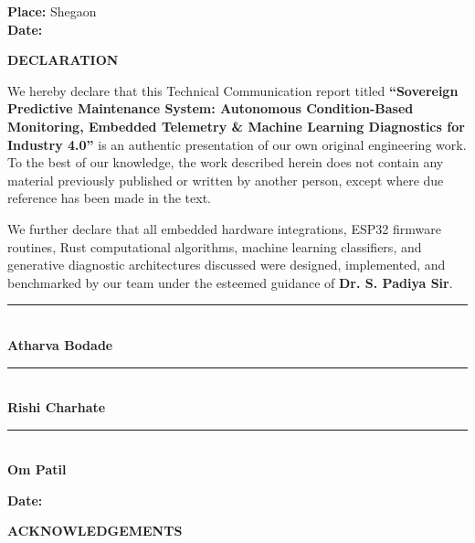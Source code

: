 \documentclass[12pt,a4paper,oneside]{report}
\begin{document}
\vspace{20mm}
\noindent \textbf{Place:} Shegaon \\
\textbf{Date:} \dotfill

\newpage
\thispagestyle{plain}
\begin{center}
    {\Large \textbf{DECLARATION}}\\[10mm]
\end{center}

\noindent We hereby declare that this Technical Communication report titled \textbf{``Sovereign Predictive Maintenance System: Autonomous Condition-Based Monitoring, Embedded Telemetry \& Machine Learning Diagnostics for Industry 4.0''} is an authentic presentation of our own original engineering work. To the best of our knowledge, the work described herein does not contain any material previously published or written by another person, except where due reference has been made in the text. 

\noindent We further declare that all embedded hardware integrations, ESP32 firmware routines, Rust computational algorithms, machine learning classifiers, and generative diagnostic architectures discussed were designed, implemented, and benchmarked by our team under the esteemed guidance of \textbf{Dr. S. Padiya Sir}.

\vspace{30mm}

\noindent
\begin{minipage}[t]{0.32\textwidth}
    \centering
    \rule{40mm}{0.4pt}\\[1mm]
    \textbf{Atharva Bodade}
\end{minipage}
\hfill
\begin{minipage}[t]{0.32\textwidth}
    \centering
    \rule{40mm}{0.4pt}\\[1mm]
    \textbf{Rishi Charhate}
\end{minipage}
\hfill
\begin{minipage}[t]{0.32\textwidth}
    \centering
    \rule{40mm}{0.4pt}\\[1mm]
    \textbf{Om Patil}
\end{minipage}

\vspace{20mm}
\noindent \textbf{Date:} \dotfill

\newpage
\thispagestyle{plain}
\begin{center}
    {\Large \textbf{ACKNOWLEDGEMENTS}}\\[8mm]
\end{center}
\end{document}
